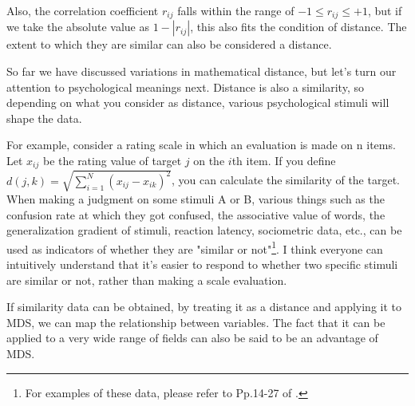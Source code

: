 \documentclass{ltjsbook}
\begin{document}
Also, the correlation coefficient $r_{ij}$ falls within the range of $-1 \le r_{ij} \le +1$, but if we take the absolute value as $1-|r_{ij}|$, this also fits the condition of distance. The extent to which they are similar can also be considered a distance.

So far we have discussed variations in mathematical distance, but let's turn our attention to psychological meanings next.
Distance is also a similarity, so depending on what you consider as distance, various psychological stimuli will shape the data.

For example, consider a rating scale in which an evaluation is made on n items. Let $x_{ij}$ be the rating value of target $j$ on the $i$th item.
If you define $d(j,k) = \sqrt{\sum_{i=1}^N (x_{ij}-x_{ik})^2 }$, you can calculate the similarity of the target.
When making a judgment on some stimuli A or B, various things such as the confusion rate at which they got confused, the associative value of words, the generalization gradient of stimuli, reaction latency, sociometric data, etc., can be used as indicators of whether they are "similar or not"\footnote{For examples of these data, please refer to Pp.14-27 of \textcite{Takane198002}.}. I think everyone can intuitively understand that it's easier to respond to whether two specific stimuli are similar or not, rather than making a scale evaluation.

If similarity data can be obtained, by treating it as a distance and applying it to MDS, we can map the relationship between variables. The fact that it can be applied to a very wide range of fields can also be said to be an advantage of MDS.
\end{document}
